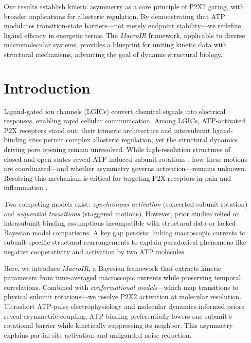 \documentclass[pdflatex,sn-mathphys-num]{sn-jnl}%
\theoremstyle{thmstyleone}%
\theoremstyle{thmstyletwo}%
\theoremstyle{thmstylethree}%
\begin{document}
Our results establish kinetic asymmetry as a core principle of P2X2 gating, with broader implications for allosteric regulation. By demonstrating that ATP modulates transition-state barriers—not merely endpoint stability—we redefine ligand efficacy in energetic terms. The \textit{MacroIR} framework, applicable to diverse macromolecular systems, provides a blueprint for uniting kinetic data with structural mechanisms, advancing the goal of dynamic structural biology.


\section{Introduction}
\label{sec1}

Ligand-gated ion channels (LGICs) convert chemical signals into electrical responses, enabling rapid cellular communication. Among LGICs, ATP-activated P2X receptors stand out: their trimeric architecture and intersubunit ligand-binding sites permit complex allosteric regulation, yet the structural dynamics driving pore opening remain unresolved. While high-resolution structures of closed and open states reveal ATP-induced subunit rotations \cite{cerrada_p2x,abierta_p2x}, how these motions are coordinated—and whether asymmetry governs activation—remains unknown. Resolving this mechanism is critical for targeting P2X receptors in pain and inflammation \cite{therapeutic,p2x7_pharmacology}.

Two competing models exist: \textit{synchronous activation} (concerted subunit rotation) and \textit{sequential transitions} (staggered motions). However, prior studies relied on intrasubunit binding assumptions incompatible with structural data \cite{Moffatt_hume} or lacked Bayesian model comparisons. A key gap persists: linking macroscopic currents to subunit-specific structural rearrangements to explain paradoxical phenomena like negative cooperativity and activation by two ATP molecules.

Here, we introduce \textit{MacroIR}, a Bayesian framework that extracts kinetic parameters from time-averaged macroscopic currents while preserving temporal correlations. Combined with \textit{conformational models}—which map transitions to physical subunit rotations—we resolve P2X2 activation at molecular resolution. Ultrashort ATP-pulse electrophysiology \cite{Moffatt_hume} and molecular dynamics-informed priors reveal asymmetric coupling: ATP binding preferentially lowers one subunit’s rotational barrier while kinetically suppressing its neighbor. This asymmetry explains partial-site activation and unliganded noise reduction. 
\end{document}
